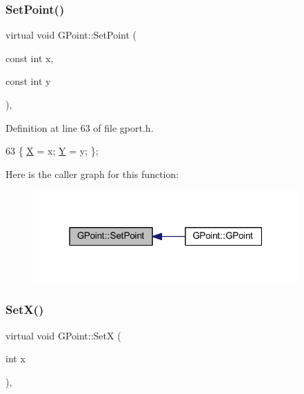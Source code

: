 \subsubsection{\texorpdfstring{Set\+Point()}{SetPoint()}}
{\footnotesize\ttfamily virtual void G\+Point\+::\+Set\+Point (\begin{DoxyParamCaption}\item[{const int}]{x,  }\item[{const int}]{y }\end{DoxyParamCaption})\hspace{0.3cm}{\ttfamily [inline]}, {\ttfamily [virtual]}}



Definition at line 63 of file gport.\+h.


\begin{DoxyCode}
63 \{ \mbox{\hyperlink{class_g_point_a0a26572e08c37a5e7e6854ae8c7fee66}{X}} = x; \mbox{\hyperlink{class_g_point_aca224bb9b30fab3b59cd25a9261c1069}{Y}} = y; \};
\end{DoxyCode}
Here is the caller graph for this function\+:\nopagebreak
\begin{figure}[H]
\begin{center}
\leavevmode
\includegraphics[width=289pt]{class_g_point_ad6f78b03b847082c2e2feb0a3612f0c5_icgraph}
\end{center}
\end{figure}
\mbox{\label{class_g_point_aa2e1b46333fea1d31b1db8eea7a4bbd6}} 
\subsubsection{\texorpdfstring{Set\+X()}{SetX()}}
{\footnotesize\ttfamily virtual void G\+Point\+::\+SetX (\begin{DoxyParamCaption}\item[{int}]{x }\end{DoxyParamCaption})\hspace{0.3cm}{\ttfamily [inline]}, {\ttfamily [virtual]}}



